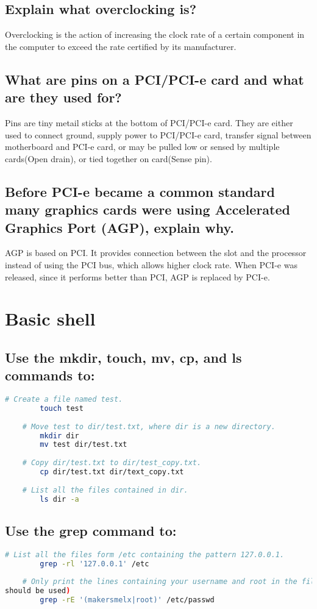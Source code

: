 \documentclass[12pt,a4paper]{article}
\theoremstyle{definition}
\begin{document}
\subsection{Explain what overclocking is?}
    \par Overclocking is the action of increasing the clock rate of a certain component in the computer to exceed the rate certified by its manufacturer.
\subsection{What are pins on a PCI/PCI-e card and what are they used for?}
    \par Pins are tiny metail sticks at the bottom of PCI/PCI-e card. They are either used to connect ground, supply power to PCI/PCI-e card, transfer signal between motherboard and PCI-e card, or may be pulled low or sensed by multiple cards(Open drain), or tied together on card(Sense pin).
\newpage
\subsection{Before PCI-e became a common standard many graphics cards were using Accelerated Graphics
Port (AGP), explain why.}
    \par AGP is based on PCI. It provides connection between the slot and the processor instead of using the PCI bus, which allows higher clock rate. When PCI-e was released, since it performs better than PCI, AGP is replaced by PCI-e.
    
\section{Basic shell}
\subsection{Use the mkdir, touch, mv, cp, and ls commands to:}
\begin{lstlisting}[language=sh]
    # Create a file named test.
        touch test
        
    # Move test to dir/test.txt, where dir is a new directory.
        mkdir dir
        mv test dir/test.txt
        
    # Copy dir/test.txt to dir/test_copy.txt.
        cp dir/test.txt dir/text_copy.txt
        
    # List all the files contained in dir.
        ls dir -a
\end{lstlisting}
\subsection{Use the grep command to:}
\begin{lstlisting}[language=sh]
    # List all the files form /etc containing the pattern 127.0.0.1.
        grep -rl '127.0.0.1' /etc
    
    # Only print the lines containing your username and root in the file /etc/passwd (only one grep
should be used)
        grep -rE '(makersmelx|root)' /etc/passwd
\end{lstlisting}
\end{document}
